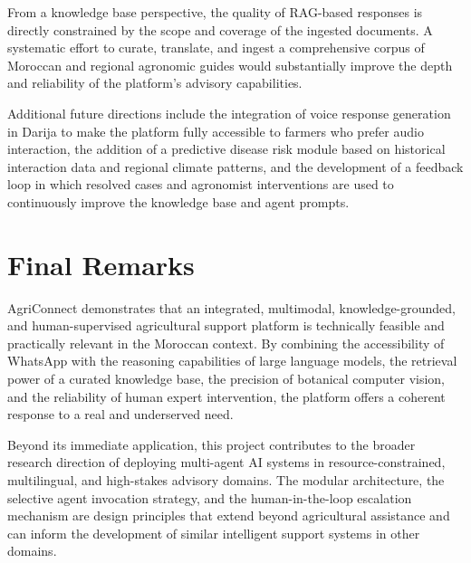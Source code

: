 From a knowledge base perspective, the quality of RAG-based responses is directly constrained by the scope and coverage of the ingested documents. A systematic effort to curate, translate, and ingest a comprehensive corpus of Moroccan and regional agronomic guides would substantially improve the depth and reliability of the platform's advisory capabilities.

Additional future directions include the integration of voice response generation in Darija to make the platform fully accessible to farmers who prefer audio interaction, the addition of a predictive disease risk module based on historical interaction data and regional climate patterns, and the development of a feedback loop in which resolved cases and agronomist interventions are used to continuously improve the knowledge base and agent prompts.

\section{Final Remarks}

AgriConnect demonstrates that an integrated, multimodal, knowledge-grounded, and human-supervised agricultural support platform is technically feasible and practically relevant in the Moroccan context. By combining the accessibility of WhatsApp with the reasoning capabilities of large language models, the retrieval power of a curated knowledge base, the precision of botanical computer vision, and the reliability of human expert intervention, the platform offers a coherent response to a real and underserved need.

Beyond its immediate application, this project contributes to the broader research direction of deploying multi-agent AI systems in resource-constrained, multilingual, and high-stakes advisory domains. The modular architecture, the selective agent invocation strategy, and the human-in-the-loop escalation mechanism are design principles that extend beyond agricultural assistance and can inform the development of similar intelligent support systems in other domains.


